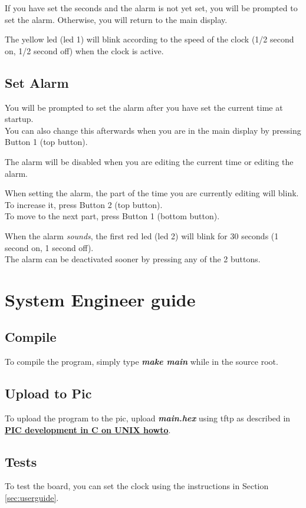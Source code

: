 \documentclass[11pt,a4paper]{scrartcl}
\begin{document}
If you have set the seconds and the alarm is not yet set, you will be prompted to set the alarm. Otherwise, you will return to the main display.

The yellow led (led 1) will blink according to the speed of the clock (1/2 second on, 1/2 second off) when the clock is active.

\subsection{Set Alarm}
You will be prompted to set the alarm after you have set the current time at startup.\\
You can also change this afterwards when you are in the main display by pressing Button 1 (top button).

The alarm will be disabled when you are editing the current time or editing the alarm.

When setting the alarm, the part of the time you are currently editing will blink.\\
To increase it, press Button 2 (top button).\\
To move to the next part, press Button 1 (bottom button).

When the alarm \textit{sounds}, the first red led (led 2) will blink for 30 seconds (1 second on, 1 second off).\\
The alarm can be deactivated sooner by pressing any of the 2 buttons.

\section{System Engineer guide}
\subsection{Compile}
To compile the program, simply type \textbf{\textit{make main}} while in the source root.

\subsection{Upload to Pic}
To upload the program to the pic, upload \textbf{\textit{main.hex}} using tftp as described in \href{http://www.foditic.org/SORTES\_14/missions/picUnixE.php}{\textbf{PIC development in C on UNIX howto}}.

\subsection{Tests}
To test the board, you can set the clock using the instructions in Section \ref{sec:userguide}.
\end{document}
